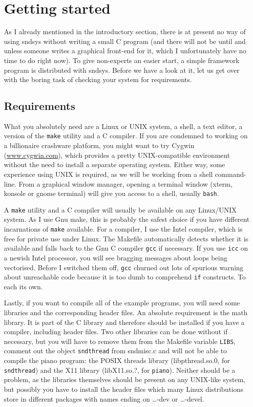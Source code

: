 \documentclass{article}
\def\s{{\sc sndsys} }
\def\sn{{\sc sndsys}}
\begin{document}
\section{Getting started}

As I already mentioned in the introductory section, there is at present no way
of using \s without writing a small C program (and there will not be until and
unless someone writes a graphical front-end for it, which I unfortunately have
no time to do right now).  To give non-experts an easier start, a simple
framework program is distributed with \sn.  Before we have a look at it, let us
get over with the boring task of checking your system for requirements.

\subsection{Requirements}

What you absolutely need are a Linux or UNIX system, a shell, a text editor, a
version of the {\tt make} utility and a C compiler.  If you are condemned to
working on a billionaire crashware platform, you might want to try Cygwin
(\url{www.cygwin.com}), which provides a pretty UNIX-compatible environment
without the need to install a separate operating system.  Either way, some
experience using UNIX is required, as we will be working from a shell
command-line.  From a graphical window manager, opening a terminal window
(xterm, konsole or gnome terminal) will give you access to a shell, usually
{\tt bash}.

A {\tt make} utility and a C compiler will usually be available on any
Linux/UNIX system.  As I use Gnu make, this is probably the safest choice if
you have different incarnations of {\tt make} available.  For a compiler, I use
the Intel compiler, which is free for private use under Linux.  The Makefile
automatically detects whether it is available and falls back to the Gnu C
compiler {\tt gcc} if necessary.  If you use {\tt icc} on a newish Intel
processor, you will see bragging messages about loops being vectorised.  Before
I switched them off, {\tt gcc} churned out lots of spurious warning about
unreachable code because it is too dumb to comprehend {\tt if} constructs.  To
each its own.

Lastly, if you want to compile all of the example programs, you will need some
libraries and the corresponding header files.  An absolute requirement is the
math library.  It is part of the C library and therefore should be installed if
you have a compiler, including header files. Two other libraries can be done
without if necessary, but you will have to remove them from the Makefile
variable {\tt LIBS}, comment out the object {\tt sndthread} from sndmisc.c and
will not be able to compile the piano program:  the POSIX threads library
(libpthread.so.0, for {\tt sndthread}) and the X11 library (libX11.so.?, for
{\tt piano}).  Neither should be a problem, as the libraries themselves should
be present on any UNIX-like system, but possibly you have to install the header
files which many Linux distributions store in different packages with names
ending on \ldots-dev or \ldots-devel.
\end{document}
